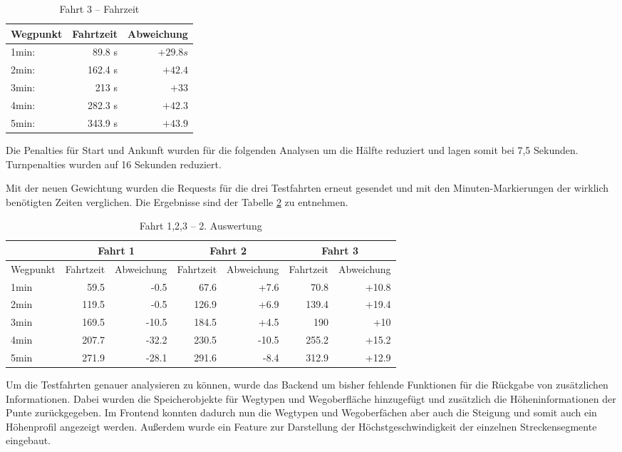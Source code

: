 \begin{table}[]
\centering
\caption{Fahrt 3 -- Fahrzeit}
\label{tab:drive3}
\begin{tabular}{|l|r|r|}
\hline
Wegpunkt & Fahrtzeit & Abweichung \\ \hline 
1min: &  89.8 s & $+29.8s$ \\
2min: &  162.4 s & $+42.4$ \\
3min: &  213 s & $+33$ \\
4min: &  282.3 s & $+42.3$ \\
5min: &  343.9 s & $+43.9$ \\
\hline
\end{tabular}
\end{table}

Die Penalties für Start und Ankunft wurden für die folgenden Analysen um die Hälfte reduziert und lagen somit bei 7,5 Sekunden. Turnpenalties wurden auf 16 Sekunden reduziert. 

Mit der neuen Gewichtung wurden die Requests für die drei Testfahrten erneut gesendet und mit den Minuten-Markierungen der wirklich benötigten Zeiten verglichen.
Die Ergebnisse sind der Tabelle \ref{tab:all} zu entnehmen.

\begin{table}[]
\centering
\caption{Fahrt 1,2,3 -- 2. Auswertung}
\label{tab:all}
\begin{tabular}{|l|r|r|r|r|r|r|}
\hhline{~|-|-|-|-|-|-}
\multicolumn{1}{l|}{} & \multicolumn{2}{c|}{Fahrt 1} & \multicolumn{2}{c|}{Fahrt 2} & \multicolumn{2}{c|}{Fahrt 3} \\ \hline
Wegpunkt & Fahrtzeit & Abweichung & Fahrtzeit & Abweichung & Fahrtzeit & Abweichung \\ \hline 
1min & 59.5 & -0.5 & 67.6 & +7.6 & 70.8 & +10.8  \\
2min & 119.5 & -0.5 & 126.9 & +6.9 & 139.4 & +19.4  \\
3min & 169.5 & -10.5 & 184.5 & +4.5 & 190 & +10  \\
4min & 207.7 & -32.2 & 230.5 & -10.5 & 255.2 & +15.2  \\
5min & 271.9 & -28.1 & 291.6 & -8.4 & 312.9 & +12.9   \\
\hline
\end{tabular}
\end{table}


Um die Testfahrten genauer analysieren zu können, wurde das Backend um bisher fehlende Funktionen für die Rückgabe von zusätzlichen Informationen. Dabei wurden die Speicherobjekte für Wegtypen und Wegoberfläche hinzugefügt und zusätzlich die Höheninformationen der Punte zurückgegeben. Im Frontend konnten dadurch nun die Wegtypen und Wegoberfächen aber auch die Steigung und somit auch ein Höhenprofil angezeigt werden. Außerdem wurde ein Feature zur Darstellung der Höchstgeschwindigkeit der einzelnen Streckensegmente eingebaut. 